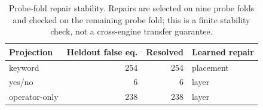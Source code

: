 \begin{table}[H]
\centering
\caption{Probe-fold repair stability. Repairs are selected on nine probe folds and checked on the remaining probe fold; this is a finite stability check, not a cross-engine transfer guarantee.}
\label{tab:repair-generalization}
\begin{tabular}{lrrl}
\toprule
Projection & Heldout false eq. & Resolved & Learned repair \\
\midrule
keyword & 254 & 254 & placement \\
yes/no & 6 & 6 & layer \\
operator-only & 238 & 238 & layer \\
\bottomrule
\end{tabular}
\end{table}
